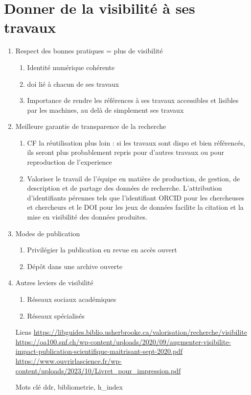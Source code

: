 \documentclass{book}
\begin{document}
\section{Donner de la visibilité à ses travaux}
\begin{enumerate}
	\item Respect des bonnes pratiques = plus de visibilité
        \begin{enumerate}
            \item Identité numérique cohérente
            \item \gls{doi} lié à chacun de ses travaux
            \item Importance de rendre les références à ses travaux accessibles et lisibles par les machines, au delà de simplement ses travaux
        \end{enumerate}
	\item Meilleure garantie de transparence de la recherche
        \begin{enumerate}
            \item CF la réutilisation plus loin : si les travaux sont dispo et bien référencés, ils seront plus probablement repris pour d'autres travaux ou pour reproduction de l'experience
            \item Valoriser le travail de l’équipe en matière de production, de gestion, de description et de partage des données de recherche. L’attribution d’identifiants pérennes tels que l’identifiant ORCID pour les chercheuses et chercheurs et le DOI pour les jeux de données facilite la citation et la mise en visibilité des données produites.
        \end{enumerate}
    \item Modes de publication
    \begin{enumerate}
        \item Privilégier la publication en revue en accès ouvert
        \item Dépôt dans une archive ouverte
    \end{enumerate}
	\item Autres leviers de visibilité
        \begin{enumerate}
            \item Réseaux sociaux académiques
            \item Réseaux spécialisés
        \end{enumerate}
\end{enumerate}

\begin{itemize}
    \item [Liens]
        \url{https://libguides.biblio.usherbrooke.ca/valorisation/recherche/visibilite}\\
        \url{https://oa100.snf.ch/wp-content/uploads/2020/09/augmenter-visibilite-impact-publication-scientifique-maitrisant-sept-2020.pdf}\\
        \url{https://www.ouvrirlascience.fr/wp-content/uploads/2023/10/Livret_pour_impression.pdf}\\
    \item [Mots clé]
         \gls{ddr}, \gls{bibliometrie}, \gls{h_index}
\end{itemize}
\end{document}
